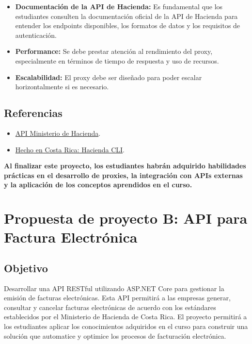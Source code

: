 \documentclass[
]{agujournal2019}
\begin{document}
\begin{itemize}
\item
  \textbf{Documentación de la API de Hacienda:} Es fundamental que los
  estudiantes consulten la documentación oficial de la API de Hacienda
  para entender los endpoints disponibles, los formatos de datos y los
  requisitos de autenticación.
\item
  \textbf{Performance:} Se debe prestar atención al rendimiento del
  proxy, especialmente en términos de tiempo de respuesta y uso de
  recursos.
\item
  \textbf{Escalabilidad:} El proxy debe ser diseñado para poder escalar
  horizontalmente si es necesario.
\end{itemize}

\subsection{Referencias}\label{referencias}

\begin{itemize}
\item
  \href{https://paper.dropbox.com/doc/API-Ministerio-de-Hacienda-znrOU6bGjTHcXjo8oUmBj}{API
  Ministerio de Hacienda}.
\item
  \href{https://medium.com/@kevinah95/hecho-en-costa-rica-hacienda-cli-d922490d6aca}{Hecho
  en Costa Rica: Hacienda CLI}.
\end{itemize}

\textbf{Al finalizar este proyecto, los estudiantes habrán adquirido
habilidades prácticas en el desarrollo de proxies, la integración con
APIs externas y la aplicación de los conceptos aprendidos en el curso.}

\section{Propuesta de proyecto B: API para Factura
Electrónica}\label{propuesta-de-proyecto-b-api-para-factura-electruxf3nica}

\subsection{Objetivo}\label{objetivo-1}

Desarrollar una API RESTful utilizando ASP.NET Core para gestionar la
emisión de facturas electrónicas. Esta API permitirá a las empresas
generar, consultar y cancelar facturas electrónicas de acuerdo con los
estándares establecidos por el Ministerio de Hacienda de Costa Rica. El
proyecto permitirá a los estudiantes aplicar los conocimientos
adquiridos en el curso para construir una solución que automatice y
optimice los procesos de facturación electrónica.
\end{document}

